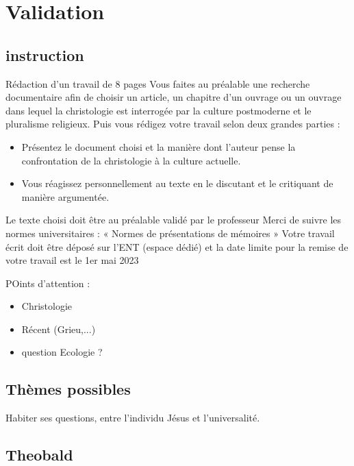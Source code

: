 \chapter{Validation}

\section{instruction}
 
Rédaction d’un travail de 8 pages
Vous faites au préalable une recherche documentaire afin de choisir un article, un chapitre
d’un ouvrage ou un ouvrage dans lequel la christologie est interrogée par la culture
postmoderne et le pluralisme religieux.
Puis vous rédigez votre travail selon deux grandes parties :
\begin{itemize}
    \item  Présentez le document choisi et la manière dont l’auteur pense la confrontation de la
christologie à la culture actuelle.
    \item  Vous réagissez personnellement au texte en le discutant et le critiquant de manière
argumentée.
\end{itemize}

Le texte choisi doit être au préalable validé par le professeur
Merci de suivre les normes universitaires : « Normes de présentations de mémoires »
Votre travail écrit doit être déposé sur l’ENT (espace dédié) et la date limite pour la
remise de votre travail est le 1er mai 2023

POints d'attention : 
\begin{itemize}
    \item Christologie
    \item Récent (Grieu,...)
    \item question Ecologie ?
\end{itemize}


\section{Thèmes possibles}

Habiter ses questions, entre l'individu Jésus et l'universalité. 






\section{Theobald}

 

